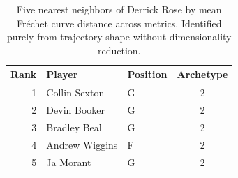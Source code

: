 \begin{table}[htbp]
  \centering\small
  \begin{tabular}{rllc}
    \toprule
    Rank & Player & Position & Archetype \\
    \midrule
    1 & Collin Sexton & G & 2 \\
    2 & Devin Booker & G & 2 \\
    3 & Bradley Beal & G & 2 \\
    4 & Andrew Wiggins & F & 2 \\
    5 & Ja Morant & G & 2 \\
    \bottomrule
  \end{tabular}
  \caption{Five nearest neighbors of Derrick Rose by mean Fr\'{e}chet curve distance across metrics. Identified purely from trajectory shape without dimensionality reduction.}
  \label{tab:Derrick_Rose_frechet_curve_neighbors}
\end{table}

